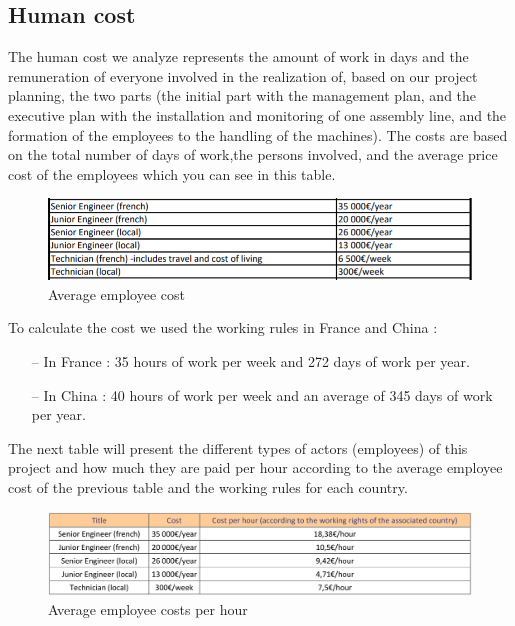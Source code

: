 \subsection{Human cost}
The human cost we analyze represents the amount of work in days and the remuneration of everyone involved in the realization of, based on our project planning, the two parts (the initial part with the management plan, and the executive plan with the installation and monitoring of one assembly line, and the formation of the employees to the handling of the machines).
The costs are based on the total number of days of work,the persons involved, and the average price cost of the employees which you can see in this table.

\begin{figure}[h]

\centering
\includegraphics[scale=1]{Img/humanCost.png}
\caption{Average employee cost}

\end{figure}

To calculate the cost we used the working rules in France and China :
\begin{itemize}
	\item[--] In France : 35 hours of work per week and 272 days of work per year.
	\item[--] In China :  40 hours of work per week and an average of 345 days of work per year. \\
\end{itemize}

The next table will present the different types of actors (employees) of this project and how much they are paid per hour according to the average employee cost of the previous table and the working rules for each country.

\begin{figure}[h]

\centering
\includegraphics[scale=0.6]{Img/HumanCostPerHours.png}
\caption{Average employee costs per hour}

\end{figure}

